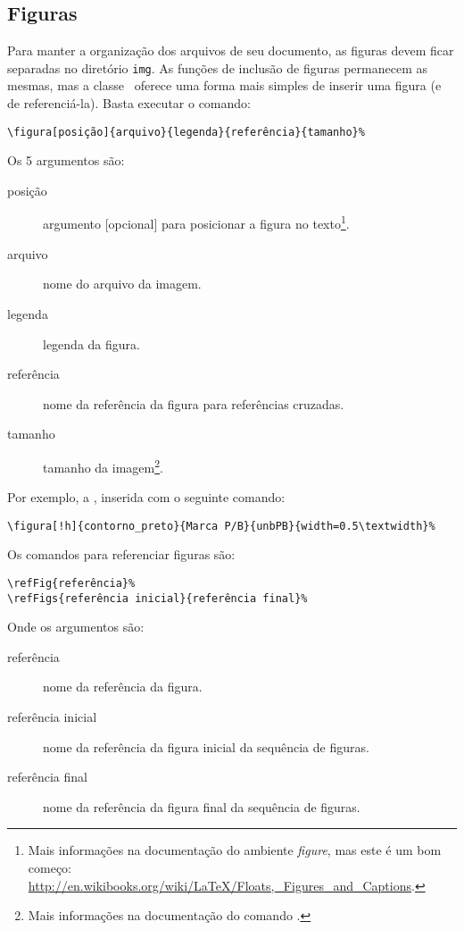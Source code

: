 \subsection{Figuras}
Para manter a organização dos arquivos de seu documento, as figuras devem ficar
separadas no diretório \texttt{img}. As funções de inclusão de figuras permanecem
as mesmas, mas a classe \unbcic\ oferece uma forma mais simples de inserir uma
figura (e de referenciá-la). Basta executar o comando:

\begin{verbatim}
\figura[posição]{arquivo}{legenda}{referência}{tamanho}%
\end{verbatim}

Os 5 argumentos são:
\begin{description}
\item[posição] argumento [opcional] para posicionar a figura no texto\footnote{Mais
informações na documentação do ambiente \emph{figure}, mas este é um bom começo: \url{http://en.wikibooks.org/wiki/LaTeX/Floats,_Figures_and_Captions}.}.
\item[arquivo] nome do arquivo da imagem.
\item[legenda] legenda da figura.
\item[referência] nome da referência da figura para referências cruzadas.
\item[tamanho] tamanho da imagem\footnote{Mais informações na documentação do comando
.}.
\end{description}

Por exemplo, a , inserida com o seguinte comando:

\begin{verbatim}
\figura[!h]{contorno_preto}{Marca P/B}{unbPB}{width=0.5\textwidth}%
\end{verbatim}

%

Os comandos para referenciar figuras são:

\begin{verbatim}
\refFig{referência}%
\refFigs{referência inicial}{referência final}%
\end{verbatim}

Onde os argumentos são:
\begin{description}
\item[referência] nome da referência da figura.
\item[referência inicial] nome da referência da figura inicial da sequência de figuras.
\item[referência final] nome da referência da figura final da sequência de figuras.
\end{description}

